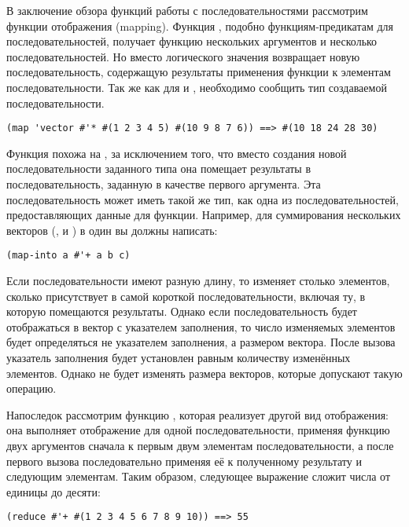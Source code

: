 В заключение обзора функций работы с последовательностями рассмотрим
функции отображения (mapping).  Функция , подобно функциям-предикатам для
последовательностей, получает функцию нескольких аргументов и несколько
последовательностей.  Но вместо логического значения  возвращает новую
последовательность, содержащую результаты применения функции к элементам
последовательности.  Так же как для  и , 
необходимо сообщить тип создаваемой последовательности.

\begin{lstlisting}[style=lisprepl]
  (map 'vector #'* #(1 2 3 4 5) #(10 9 8 7 6)) ==> #(10 18 24 28 30)
\end{lstlisting}

Функция  похожа на , за исключением того, что вместо создания
новой последовательности заданного типа она помещает результаты в последовательность,
заданную в качестве первого аргумента.  Эта последовательность может иметь такой же тип,
как одна из последовательностей, предоставляющих данные для функции.  Например, для
суммирования нескольких векторов (,  и ) в один вы должны
написать:

\begin{lstlisting}[style=lisprepl]
  (map-into a #'+ a b c)
\end{lstlisting}

Если последовательности имеют разную длину, то  изменяет столько элементов,
сколько присутствует в самой короткой последовательности, включая ту, в которую помещаются
результаты.  Однако если последовательность будет отображаться в вектор с указателем
заполнения, то число изменяемых элементов будет определяться не указателем заполнения, а
размером вектора.  После вызова  указатель заполнения будет установлен
равным количеству изменённых элементов. Однако  не будет изменять размера
векторов, которые допускают такую операцию.

Напоследок рассмотрим функцию ,
которая реализует другой вид отображения: она выполняет отображение для
одной последовательности, применяя функцию двух аргументов сначала к первым двум элементам
последовательности, а после первого вызова последовательно применяя её к полученному
результату и следующим элементам.  Таким образом, следующее выражение сложит числа от
единицы до десяти:

\begin{lstlisting}[style=lisprepl]
  (reduce #'+ #(1 2 3 4 5 6 7 8 9 10)) ==> 55
\end{lstlisting}

